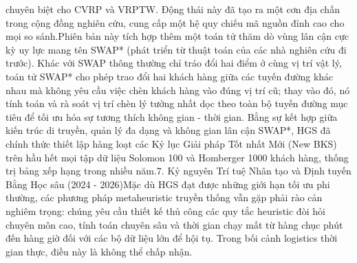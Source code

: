 \documentclass[13pt, a4paper]{extarticle} %
\begin{document}
chuyên biệt cho CVRP và VRPTW. Động thái này đã tạo ra một cơn địa chấn trong cộng đồng nghiên cứu, cung cấp một hệ quy chiếu mã nguồn đỉnh cao cho mọi so sánh.Phiên bản này tích hợp thêm một toán tử thăm dò vùng lân cận cực kỳ uy lực mang tên SWAP* (phát triển từ thuật toán của các nhà nghiên cứu đi trước). Khác với SWAP thông thường chỉ tráo đổi hai điểm ở cùng vị trí vật lý, toán tử SWAP* cho phép trao đổi hai khách hàng giữa các tuyến đường khác nhau mà không yêu cầu việc chèn khách hàng vào đúng vị trí cũ; thay vào đó, nó tính toán và rà soát vị trí chèn lý tưởng nhất dọc theo toàn bộ tuyến đường mục tiêu để tối ưu hóa sự tương thích không gian - thời gian. Bằng sự kết hợp giữa kiến trúc di truyền, quản lý đa dạng và không gian lân cận SWAP*, HGS đã chính thức thiết lập hàng loạt các Kỷ lục Giải pháp Tốt nhất Mới (New BKS) trên hầu hết mọi tập dữ liệu Solomon 100 và Homberger 1000 khách hàng, thống trị bảng xếp hạng trong nhiều năm.7. Kỷ nguyên Trí tuệ Nhân tạo và Định tuyến Bằng Học sâu (2024 - 2026)Mặc dù HGS đạt được những giới hạn tối ưu phi thường, các phương pháp metaheuristic truyền thống vẫn gặp phải rào cản nghiêm trọng: chúng yêu cầu thiết kế thủ công các quy tắc heuristic đòi hỏi chuyên môn cao, tính toán chuyên sâu và thời gian chạy mất từ hàng chục phút đến hàng giờ đối với các bộ dữ liệu lớn để hội tụ. Trong bối cảnh logistics thời gian thực, điều này là không thể chấp nhận.
\end{document}
